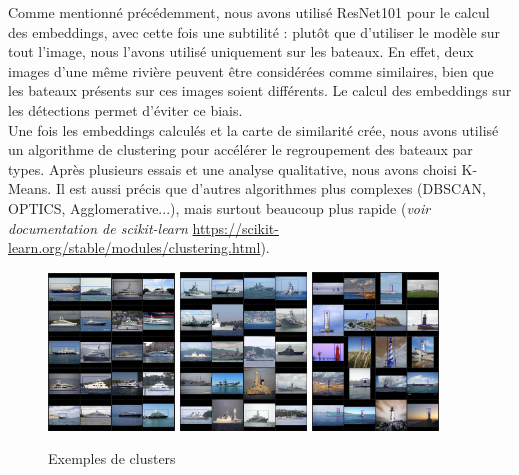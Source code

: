 Comme mentionné précédemment, nous avons utilisé ResNet101 pour le calcul des embeddings,
avec cette fois une subtilité : plutôt que d'utiliser le modèle sur tout l'image, nous
l'avons utilisé uniquement sur les bateaux. En effet, deux images d'une même rivière
peuvent être considérées comme similaires, bien que les bateaux présents sur ces images
soient différents. Le calcul des embeddings sur les détections permet d'éviter ce biais.\\

Une fois les embeddings calculés et la carte de similarité crée, nous avons utilisé un algorithme
de clustering pour accélérer le regroupement des bateaux par types. Après plusieurs essais et une analyse
qualitative, nous avons choisi K-Means. Il est aussi précis que d'autres algorithmes plus complexes (DBSCAN,
OPTICS, Agglomerative...), mais surtout beaucoup plus rapide (\textit{voir documentation
de scikit-learn }\url{https://scikit-learn.org/stable/modules/clustering.html}).

\begin{figure}[H]
    \centering
    \includegraphics[width=0.3\textwidth]{./img/yachts.png}
    \includegraphics[width=0.3\textwidth]{./img/warships.png}
    \includegraphics[width=0.3\textwidth]{./img/lighthouses.png}
    \caption{Exemples de clusters}
\end{figure}

